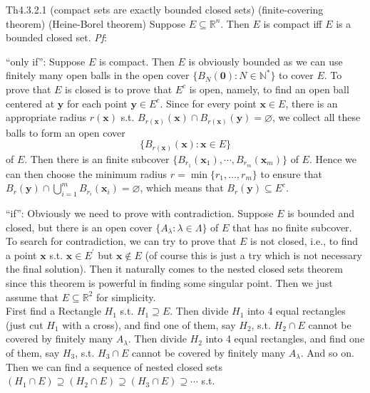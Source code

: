 \documentclass{article}
\begin{document}
\begin{Th}{Th4.3.2.1 (compact sets are exactly bounded closed sets) (finite-covering theorem) (Heine-Borel theorem)}
    Suppose $E\subseteq\mathbb{R}^n$. Then $E$ is compact iff $E$ is a bounded closed set.
    \tcblower
    \textit{Pf}: 
    \begin{compactenum}
        \item ``only if'': Suppose $E$ is compact. Then $E$ is obviously bounded as we can use finitely many open balls in the open cover $\{B_N(\pmb{0}): N\in\mathbb{N}^\ast\}$ to cover $E$. To prove that $E$ is closed is to prove that $E^c$ is open, namely, to find an open ball centered at $\pmb{y}$ for each point $\pmb{y}\in E^c$. Since for every point $\pmb{x}\in E$, there is an appropriate radius $r(\pmb{x})$ s.t. $B_{r(\pmb{x})}(\pmb{x})\cap B_{r(\pmb{x})}(\pmb{y}) = \varnothing$, we collect all these balls to form an open cover
        $$\{B_{r(\pmb{x})}(\pmb{x}): \pmb{x}\in E\}$$
        of $E$. Then there is an finite subcover $\{B_{r_1}(\pmb{x}_1), \cdots, B_{r_m}(\pmb{x}_m)\}$ of $E$. Hence we can then choose the minimum radius $r = \min\{r_1, \dots, r_m\}$ to ensure that $B_r(\pmb{y})\cap \bigcup_{i=1}^m B_{r_i}(\pmb{x}_i) = \varnothing$, which means that $B_r(\pmb{y})\subseteq E^c$.
        \item ``if'': Obviously we need to prove with contradiction. Suppose $E$ is bounded and closed, but there is an open cover $\{A_\lambda: \lambda\in\Lambda\}$ of $E$ that has no finite subcover. \\
        To search for contradiction, we can try to prove that $E$ is not closed, i.e., to find a point $\pmb{x}$ s.t. $\pmb{x}\in E^\prime$ but $\pmb{x}\notin E$ (of course this is just a try which is not necessary the final solution). Then it naturally comes to the nested closed sets theorem since this theorem is powerful in finding some singular point. Then we just assume that $E\subseteq \mathbb{R}^2$ for simplicity. \\
        First find a Rectangle $H_1$ s.t. $H_1\supseteq E$. Then divide $H_1$ into 4 equal rectangles (just cut $H_1$ with a cross), and find one of them, say $H_2$, s.t. $H_2\cap E$ cannot be covered by finitely many $A_\lambda$. Then divide $H_2$ into 4 equal rectangles, and find one of them, say $H_3$, s.t. $H_3\cap E$ cannot be covered by finitely many $A_\lambda$. And so on. Then we can find a sequence of nested closed sets $(H_1\cap E)\supseteq (H_2\cap E)\supseteq (H_3\cap E)\supseteq \cdots$ s.t. 
        \begin{compactenum}

\end{compactenum}
\end{compactenum}
\end{Th}
\end{document}
